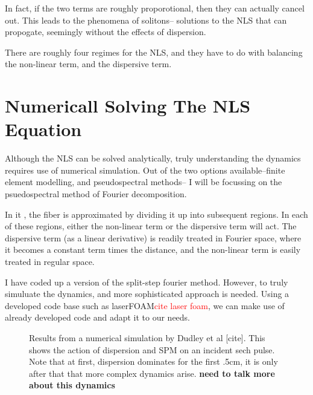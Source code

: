 \documentclass[12pt, titlepage]{article}
\begin{document}
\begin{spacing}{1.1}
In fact, if the two terms are roughly proporotional, then they can
actually cancel out. This leads to the phenomena of solitons-- solutions to the NLS that can propogate, seemingly without the effects of dispersion. 

There are roughly four regimes for the NLS, and they have to do with balancing the non-linear term, and the dispersive term.
\begin{comment}
ToDo:
I still need to flush out this section more.
Figures: I want two figures-- one that shows the action of each term in the nsl
also see the thesis, there is some helpful exposition in there.
\end{comment}
\section{Numericall Solving The NLS Equation}
Although the NLS can be solved analytically, truly understanding the dynamics requires use of numerical simulation. Out of the two options available--finite element modelling, and pseudospectral methods-- I will be focussing on the psuedospectral method of Fourier decomposition.

In it , the fiber is approximated by dividing it up into subsequent regions. In each of these regions, either the non-linear term or the dispersive term will act. The dispersive term (as a linear derivative) is readily treated in Fourier space, where it becomes a constant term times the distance, and the non-linear term is easily treated in regular space.



I have coded up a version of the split-step fourier method. However, to truly simuluate the dynamics, and more sophisticated approach is needed. Using a developed code base such as laserFOAM\textcolor{red}{cite laser foam}, we can make use of
already developed code and adapt it to our needs. 



\begin{figure}[H]
 \centering
                    \caption{Results from a numerical simulation by Dudley et al [cite]. This shows the action of dispersion and SPM on an incident sech pulse. Note that at first, dispersion dominates for the first .5cm, it is only after that that more complex dynamics arise. \textbf{need to talk more about this dynamics}}
                    
                              \label{intial spectrum}
                              \end{figure}

\end{spacing}
{}
\end{document}
